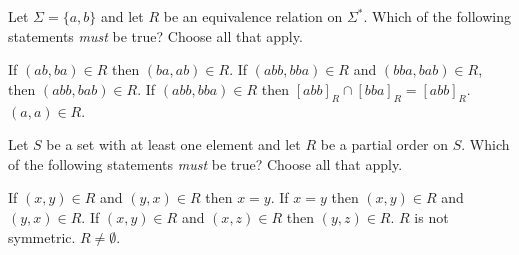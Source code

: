 \documentclass[addpoints]{exam}
\begin{document}
\begin{questions}
\question[4] Let $\Sigma = \{a,b\}$ and let $R$ be an equivalence relation on $\Sigma^*$. 
Which of the following statements \emph{must} be true? Choose all that apply.

\begin{checkboxes}
\CorrectChoice If $(ab, ba) \in R$ then $(ba,ab) \in R$.
\CorrectChoice If $(abb,bba) \in R$ and $(bba,bab) \in R$, then $(abb,bab) \in R$.
\CorrectChoice If $(abb,bba) \in R$ then $[abb]_R \cap [bba]_R = [abb]_R$.
\CorrectChoice $(a,a) \in R$.
\end{checkboxes}

\vspace{8mm}
\question[5]
Let $S$ be a set with at least one element and let $R$ be a partial order on $S$. 
Which of the following statements \emph{must} be true? Choose all that apply.

\begin{checkboxes}
\CorrectChoice If $(x,y) \in R$ and $(y,x) \in R$ then $x = y$. 
\CorrectChoice If $x = y$ then $(x,y) \in R$ and $(y,x) \in R$. 
\choice If $(x,y) \in R$ and $(x,z) \in R$ then $(y,z) \in R$. 
\choice $R$ is not symmetric. 
\CorrectChoice $R \neq \emptyset$.
\end{checkboxes}

\vspace{5mm}
\end{questions}
\end{document}
